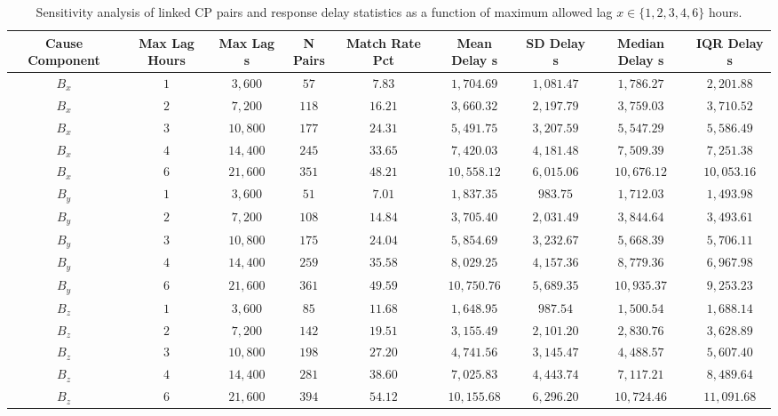 \vspace{-3pt}
\begin{table}[H]
\caption{Sensitivity analysis of linked CP pairs and response delay statistics as a function of maximum allowed lag $x \in \{1, 2, 3, 4, 6\}$ hours.\label{tab:Sensitivity_Analysis_Max_Lag}}
\begin{tabularx}{\textwidth}{CCCCCCCCC}
\toprule
\textbf{Cause Component} & \textbf{Max Lag Hours} & \textbf{Max Lag s} & \textbf{N Pairs} & \textbf{Match Rate Pct} & \textbf{Mean Delay s} & \textbf{SD Delay s} & \textbf{Median Delay s} & \textbf{IQR Delay s} \\
\midrule
$B_x$ & $1$ & $3,600$ & $57$ & $7.83$ & $1,704.69$ & $1,081.47$ & $1,786.27$ & $2,201.88$ \\
$B_x$ & $2$ & $7,200$ & $118$ & $16.21$ & $3,660.32$ & $2,197.79$ & $3,759.03$ & $3,710.52$ \\
$B_x$ & $3$ & $10,800$ & $177$ & $24.31$ & $5,491.75$ & $3,207.59$ & $5,547.29$ & $5,586.49$ \\
$B_x$ & $4$ & $14,400$ & $245$ & $33.65$ & $7,420.03$ & $4,181.48$ & $7,509.39$ & $7,251.38$ \\
$B_x$ & $6$ & $21,600$ & $351$ & $48.21$ & $10,558.12$ & $6,015.06$ & $10,676.12$ & $10,053.16$ \\
$B_y$ & $1$ & $3,600$ & $51$ & $7.01$ & $1,837.35$ & $983.75$ & $1,712.03$ & $1,493.98$ \\
$B_y$ & $2$ & $7,200$ & $108$ & $14.84$ & $3,705.40$ & $2,031.49$ & $3,844.64$ & $3,493.61$ \\
$B_y$ & $3$ & $10,800$ & $175$ & $24.04$ & $5,854.69$ & $3,232.67$ & $5,668.39$ & $5,706.11$ \\
$B_y$ & $4$ & $14,400$ & $259$ & $35.58$ & $8,029.25$ & $4,157.36$ & $8,779.36$ & $6,967.98$ \\
$B_y$ & $6$ & $21,600$ & $361$ & $49.59$ & $10,750.76$ & $5,689.35$ & $10,935.37$ & $9,253.23$ \\
$B_z$ & $1$ & $3,600$ & $85$ & $11.68$ & $1,648.95$ & $987.54$ & $1,500.54$ & $1,688.14$ \\
$B_z$ & $2$ & $7,200$ & $142$ & $19.51$ & $3,155.49$ & $2,101.20$ & $2,830.76$ & $3,628.89$ \\
$B_z$ & $3$ & $10,800$ & $198$ & $27.20$ & $4,741.56$ & $3,145.47$ & $4,488.57$ & $5,607.40$ \\
$B_z$ & $4$ & $14,400$ & $281$ & $38.60$ & $7,025.83$ & $4,443.74$ & $7,117.21$ & $8,489.64$ \\
$B_z$ & $6$ & $21,600$ & $394$ & $54.12$ & $10,155.68$ & $6,296.20$ & $10,724.46$ & $11,091.68$ \\

\end{tabularx}
\end{table}
